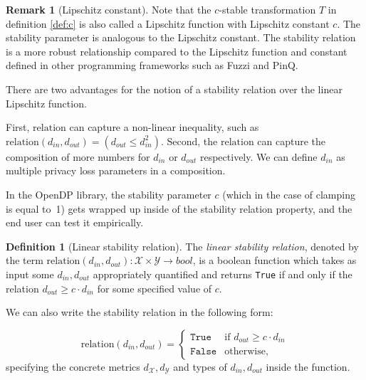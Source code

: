 \documentclass[11pt,a4paper]{article}
\theoremstyle{definition}
\newtheorem{remark}[theorem]{Remark}
\newtheorem{definition}[theorem]{Definition}
\newcommand{\din}{d_{in}}
\newcommand{\dout}{d_{out}}
\newcommand{\Relation}{\mathrm{relation}}
\newcommand{\X}{\mathcal{X}}
\newcommand{\Y}{\mathcal{Y}}
\newcommand{\True}{\texttt{True}}
\newcommand{\False}{\texttt{False}}
\begin{document}
\begin{remark}[Lipschitz constant]
    Note that the $c$-stable transformation $T$ in definition \ref{def:c} is also called a Lipschitz function with Lipschitz constant $c$. The stability parameter is analogous to the Lipschitz constant.
    The stability relation is a more robust relationship compared to the Lipschitz function and constant defined in other programming frameworks such as Fuzzi and PinQ.
    
    There are two advantages for the notion of a stability relation over the linear Lipschitz function.
    
    First, $\Relation$ can capture a non-linear inequality, such as $\Relation(\din, \dout) = (\dout \leq \din^2)$. Second, the $\Relation$ can capture the composition of more numbers for $\din$ or $\dout$ respectively. We can define $\din$ as multiple privacy loss parameters in a composition.
    
    In the OpenDP library, the stability parameter $c$ (which in the case of clamping is equal to~1) gets wrapped up inside of the stability relation property, and the end user can test it empirically.
\end{remark}

\begin{definition}[Linear stability relation]
\label{defn:lin-stab-rel}
    The \textit{linear stability relation}, denoted by the term $\Relation(\din, \dout):\mathcal{X}\times\mathcal{Y}\rightarrow bool$, is a boolean function which takes as input some $\din, \dout$ appropriately quantified and returns \texttt{True} if and only if the relation $\dout \geq c \cdot \din$ for some specified value of $c$. 

    We can also write the stability relation in the following form:
    
    \begin{equation}
        \Relation(\din, \dout) = 
        \begin{cases} 
          \True & \textrm{if } \dout \geq c \cdot \din \\
          \False & \textrm{otherwise},
       \end{cases}
    \end{equation}
    specifying the concrete metrics $d_{\X}, d_{\Y}$ and types of $\din, \dout$ inside the function.
\end{definition}
\end{document}
